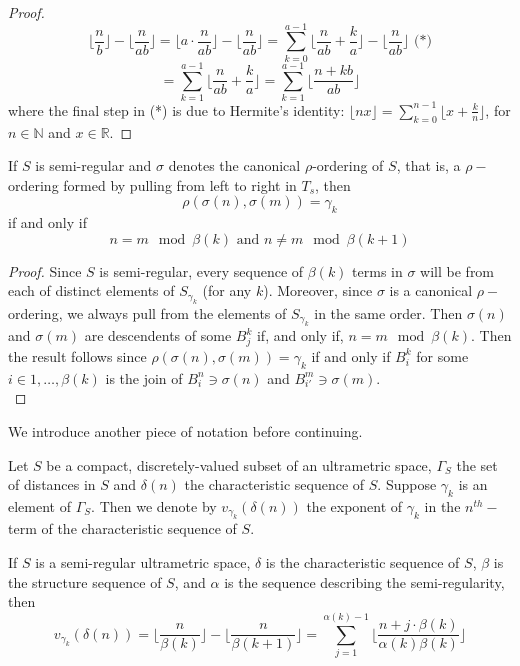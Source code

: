 \begin{proof}
\[\lfloor\frac{n}{b} \rfloor - \lfloor \frac{n}{ab} \rfloor = \lfloor a \cdot \frac{n}{ab} \rfloor - \lfloor \frac{n}{ab} \rfloor  = \sum_{k=0}^{a-1} \lfloor \frac{n}{ab} + \frac{k}{a} \rfloor - \lfloor \frac{n}{ab} \rfloor \text{ (*)}\]
\[= \sum_{k=1}^{a-1} \lfloor \frac{n}{ab} + \frac{k}{a} \rfloor = \sum_{k=1}^{a-1} \lfloor \frac{n + kb}{ab} \rfloor \]
where the final step in (*) is due to Hermite's identity: $\lfloor nx \rfloor = \sum_{k=0}^{n-1} \lfloor x + \frac{k}{n} \rfloor$, for $n \in \mathbb{N}$ and $x \in \mathbb{R}$.
\end{proof}                                                                                                              

\begin{lemma}
If $S$ is semi-regular and $\sigma$ denotes the canonical $\rho$-ordering of $S$, that is, a $\rho-$ordering formed by pulling from left to right in $T_s$, then \[\rho(\sigma(n),\sigma(m))=\gamma_k\] if and only if \[ n=m \mod \beta(k) \text{  and } n \neq m \mod \beta(k+1)\]
\end{lemma}

\begin{proof}
Since $S$ is semi-regular, every sequence of $\beta(k)$ terms in $\sigma$ will be from each of distinct elements of $S_{\gamma_k}$ (for any $k$). Moreover, since $\sigma$ is a canonical $\rho-$ordering, we always pull from the elements of $S_{\gamma_k}$ in the same order. Then $\sigma(n)$ and $\sigma(m)$ are descendents of some $B^k_j$ if, and only if, $n = m \mod \beta(k)$. Then the result follows since $\rho(\sigma(n),\sigma(m))=\gamma_k$ if and only if $B^k_i$ for some $i \in 1,\ldots, \beta(k)$ is the join of $B^n_i \ni \sigma(n)$ and $B^m_{i'} \ni \sigma(m)$.  \\ 
\end{proof}

We introduce another piece of notation before continuing.

\begin{notation}
	Let $S$ be a compact, discretely-valued subset of an ultrametric space, $\Gamma_S$ the set of distances in $S$ and $\delta(n)$ the characteristic sequence of $S$. Suppose $\gamma_k$ is an element of $\Gamma_S$. Then we denote by $v_{\gamma_k}(\delta(n))$ the exponent of $\gamma_k$ in the $n^{th}-$term of the characteristic sequence of $S$.
\end{notation}

\begin{proposition}
If $S$ is a semi-regular ultrametric space, $\delta$ is the characteristic sequence of $S$, $\beta$ is the structure sequence of $S$, and $\alpha$ is the sequence describing the semi-regularity, then
\[v_{\gamma_k}(\delta(n)) =  \lfloor\frac{n}{\beta(k)}\rfloor - \lfloor\frac{n}{\beta(k+1)}\rfloor = \sum_{j=1}^{\alpha(k)-1} \lfloor \frac{n + j\cdot \beta(k)}{\alpha(k)\beta(k)} \rfloor\]
\end{proposition}

